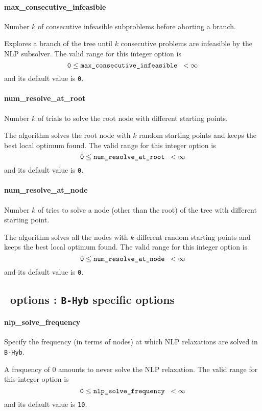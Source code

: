 \paragraph{max\_consecutive\_infeasible}
Number $k$ of consecutive infeasible subproblems before aborting a branch.

 Explores a branch of the tree
      until $k$ consecutive
problems are infeasible by the NLP subsolver. The valid range for
this integer option is
$${\tt 0} \le \hbox{\tt max\_consecutive\_infeasible } <  \infty$$
and its default value is {\tt 0}.


\paragraph{num\_resolve\_at\_root}
Number $k$ of trials to solve the root node with different starting points.

 The algorithm solves the root node with $k$
random starting points and keeps the best
local optimum found. The valid range for this integer option is
$${\tt 0} \le \hbox{\tt num\_resolve\_at\_root } <  \infty $$
and its default value is {\tt 0}.


\paragraph{num\_resolve\_at\_node}
Number $k$ of tries to solve a node (other than the root) of the tree with different starting point.

 The algorithm solves all the nodes with $k$
different random starting points and keeps
the best local optimum found. The valid range for this integer option is
$${\tt 0} \le \hbox{\tt num\_resolve\_at\_node } <  \infty$$
and its default value is {\tt 0}.



\subsection{\Bonmin\ options : {\tt B-Hyb} specific options}

\paragraph{nlp\_solve\_frequency}
Specify the frequency (in terms of nodes) at which NLP relaxations
are solved in {\tt B-Hyb}.

 A frequency of 0 amounts to never solve the
NLP relaxation. The valid range for this integer option is
$${\tt 0} \le \hbox{\tt nlp\_solve\_frequency } <  \infty$$
and its default value is {\tt 10}.


